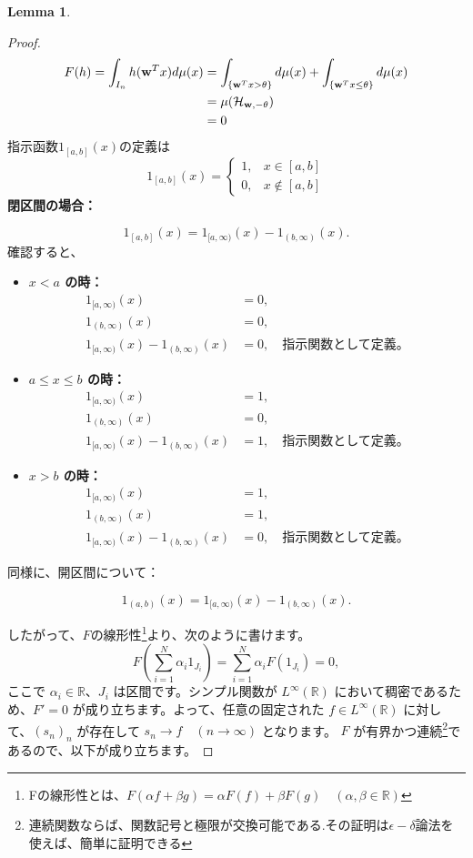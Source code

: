 \documentclass[a4paper]{jsarticle}
\theoremstyle{definition}
\newtheorem{lem}[dfn]{Lemma}
\begin{document}
\begin{lem}
\begin{proof}
\begin{align}
  F(h) = \int_{I_n} h(\mathbf{w}^T x) d\mu(x) &= \int_{\{\mathbf{w}^T x > \theta\}} d\mu(x)+\int_{\{\mathbf{w}^T x \leq \theta\}} d\mu(x)\notag \\
  &= \mu(\mathcal{H}_{\mathbf{w},-\theta}) \notag\\
  &= 0\notag
\end{align}
指示函数$1_{[a,b]}(x)$の定義は
$$
1_{[a,b]}(x) = 
\begin{cases}
1, & x \in [a,b] \\

0, & x \notin [a,b]
\end{cases}
$$
\textbf{閉区間の場合：}

\[
1_{[a,b]}(x) = 1_{[a,\infty)}(x) - 1_{(b,\infty)}(x).
\]
確認すると、

\begin{itemize}
    \item \textbf{ $x < a$ の時：}
    \begin{align*}
    1_{[a,\infty)}(x) &= 0, \\
    1_{(b,\infty)}(x) &= 0,\\
    1_{[a,\infty)}(x) - 1_{(b,\infty)}(x) &= 0, \quad \text{指示関数として定義。}
    \end{align*}

    \item \textbf{ $a \leq x \leq b$ の時：}
    \begin{align*}
    1_{[a,\infty)}(x) &= 1, \\
    1_{(b,\infty)}(x) &= 0,\\
    1_{[a,\infty)}(x) - 1_{(b,\infty)}(x) &= 1, \quad \text{指示関数として定義。}
    \end{align*}

    \item \textbf{ $x > b$ の時：}
    \begin{align*}
    1_{[a,\infty)}(x) &= 1, \\
    1_{(b,\infty)}(x) &= 1,\\
    1_{[a,\infty)}(x) - 1_{(b,\infty)}(x) &= 0, \quad \text{指示関数として定義。}
    \end{align*}
\end{itemize}

同様に、開区間について：

\[
1_{(a,b)}(x) = 1_{[a,\infty)}(x) - 1_{(b,\infty)}(x).
\]

したがって、$F$の線形性\footnote{Fの線形性とは、$F(\alpha f+\beta g)=\alpha F(f)+\beta F(g) \quad (\alpha ,\beta\in \mathbb{R})$}より、次のように書けます。
\[
F\left(\sum_{i=1}^N \alpha_i 1_{J_i}\right) = \sum_{i=1}^N \alpha_i F(1_{J_i}) = 0,
\]
ここで $\alpha_i \in \mathbb{R}$、$J_i$ は区間です。シンプル関数が $L^\infty(\mathbb{R})$ において稠密であるため、$F' = 0$ が成り立ちます。よって、任意の固定された $f \in L^\infty(\mathbb{R})$ に対して、$(s_n)_n$ が存在して $s_n \to f\quad (n\to\infty)$ となります。
$F$ が有界かつ連続\footnote{連続関数ならば、関数記号と極限が交換可能である.その証明は$\displaystyle\epsilon - \delta$論法を使えば、簡単に証明できる}であるので、以下が成り立ちます。


\end{proof}
\end{lem}
\end{document}
